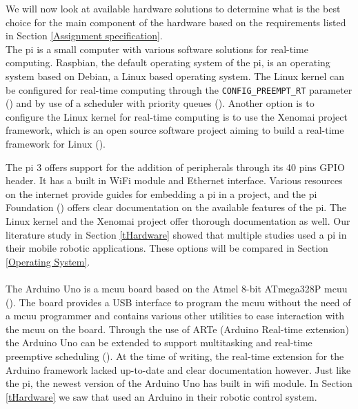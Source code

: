 \documentclass[12pt]{scrreprt}
\begin{document}
We will now look at available hardware solutions to determine what is the best choice for the main component of the hardware based on the requirements listed in Section \ref{Assignment specification}.
\\
The \gls{pi} is a small computer with various software solutions for real-time computing. Raspbian, the default operating system of the \gls{pi}, is an operating system based on Debian, a Linux based operating system. The Linux kernel can be configured for real-time computing through the \texttt{CONFIG_PREEMPT_RT} parameter (\cite{rtwiki}) and by use of a scheduler with priority queues (\cite{linux_scheduling}). Another option is to configure the Linux kernel for real-time computing is to use the Xenomai project framework, which is an open source software project aiming to build a real-time framework for Linux (\cite{xenomai}). 
\par
The \gls{pi} 3 offers support for the addition of peripherals through its 40 pins GPIO header. It has a built in WiFi module and Ethernet interface. Various resources on the internet provide guides for embedding a \gls{pi} in a project, and the \gls{pi} Foundation (\cite{foundation}) offers clear documentation on the available features of the \gls{pi}. The Linux kernel and the Xenomai project offer thorough documentation as well. Our literature study in Section \ref{tHardware} showed that multiple studies used a \gls{pi} in their mobile robotic applications. These options will be compared in Section \ref{Operating System}.
\\\\
The Arduino Uno is a \gls{mcuu} board based on the Atmel 8-bit ATmega328P \gls{mcuu} (\cite{arduinouno}). The board provides a USB interface to program the \gls{mcuu} without the need of a \gls{mcuu} programmer and contains various other utilities to ease interaction with the \gls{mcuu} on the board. Through the use of ARTe (Arduino Real-time extension) the Arduino Uno can be extended to support multitasking and real-time preemptive scheduling (\cite{ARTe}). At the time of writing,  the real-time extension for the Arduino framework lacked up-to-date and clear documentation however. Just like the \gls{pi}, the newest version of the Arduino Uno has built in \gls{wifi} module. In Section \ref{tHardware} we saw that \cite{arduino} used an Arduino in their robotic control system.
\\\\
\end{document}
